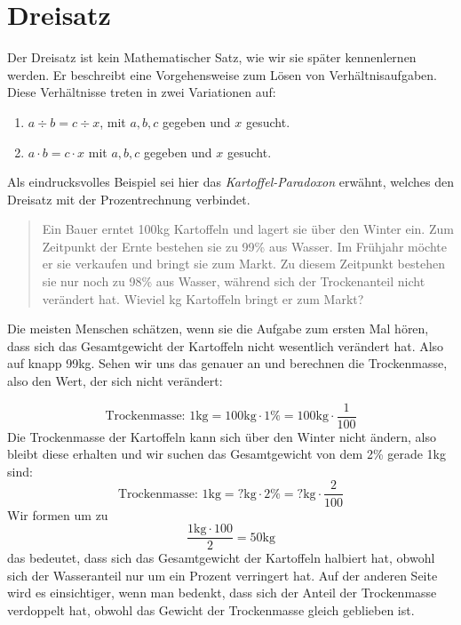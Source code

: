 \section{Dreisatz}

Der Dreisatz ist kein Mathematischer Satz, wie wir sie später kennenlernen werden. Er beschreibt eine Vorgehensweise zum Lösen von Verhältnisaufgaben. Diese Verhältnisse treten in zwei Variationen auf:

\begin{enumerate}
\item $a\div b = c\div x$, mit $a,b,c$ gegeben und $x$ gesucht.
\item $a\cdot b = c\cdot x$ mit $a,b,c$ gegeben und $x$ gesucht.
\end{enumerate}

Als eindrucksvolles Beispiel sei hier das \textsl{Kartoffel-Paradoxon} erwähnt, welches den Dreisatz mit der Prozentrechnung verbindet. 

\begin{quote}
Ein Bauer erntet 100kg Kartoffeln und lagert sie über den Winter ein. Zum Zeitpunkt der Ernte bestehen sie zu 99\% aus Wasser. Im Frühjahr möchte er sie verkaufen und bringt sie zum Markt. Zu diesem Zeitpunkt bestehen sie nur noch zu 98\% aus Wasser, während sich der Trockenanteil nicht verändert hat. Wieviel kg Kartoffeln bringt er zum Markt?
\end{quote}

Die meisten Menschen schätzen, wenn sie die Aufgabe zum ersten Mal hören, dass sich das Gesamtgewicht der Kartoffeln nicht wesentlich verändert hat. Also auf knapp 99kg. Sehen wir uns das genauer an und berechnen die Trockenmasse, also den Wert, der sich nicht verändert:

\begin{equation}\label{eq:3satz1}
\text{Trockenmasse: } 1\text{kg} = 100\text{kg} \cdot 1\% = 100\text{kg} \cdot \frac{1}{100}
\end{equation}
Die Trockenmasse der Kartoffeln kann sich über den Winter nicht ändern, also bleibt diese erhalten und wir suchen das Gesamtgewicht von dem 2\% gerade 1kg sind:
\begin{equation}
\text{Trockenmasse: } 1\text{kg} = ?\text{kg} \cdot 2\% = ?\text{kg} \cdot \frac{2}{100}
\end{equation}
Wir formen um zu 
\begin{equation}\label{eq:3satz3}
\frac{1\text{kg}\cdot 100}{2} = 50\text{kg}
\end{equation}
das bedeutet, dass sich das Gesamtgewicht der Kartoffeln halbiert hat, obwohl sich der Wasseranteil nur um ein Prozent verringert hat. Auf der anderen Seite wird es einsichtiger, wenn man bedenkt, dass sich der Anteil der Trockenmasse verdoppelt hat, obwohl das Gewicht der Trockenmasse gleich geblieben ist.

